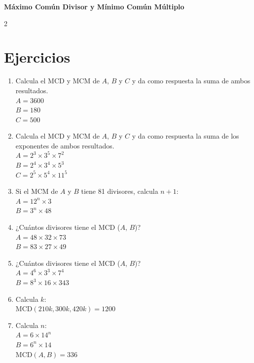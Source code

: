 \documentclass[10pt]{article}
\begin{document}
	\begin{center}
		\Large\bfseries Máximo Común Divisor y Mínimo Común Múltiplo
	\end{center}

\begin{multicols}{2}
	\section*{Ejercicios}
		\begin{enumerate}[label=\textbf{\arabic*.}, itemsep=0.4cm]
			\item Calcula el MCD y MCM de \( A \), \( B \) y \( C \) y da como respuesta la suma de ambos resultados. \\
			\( A = 3600 \) \\
			\( B = 180 \) \\
			\( C = 500 \)

			\item Calcula el MCD y MCM de \( A \), \( B \) y \( C \) y da como respuesta la suma de los exponentes de ambos resultados. \\
			\( A = 2^3 \times 3^5 \times 7^2 \) \\
			\( B = 2^4 \times 3^4 \times 5^3 \) \\
			\( C = 2^5 \times 5^4 \times 11^5 \)

			\item Si el MCM de \( A \) y \( B \) tiene 81 divisores, calcula \( n + 1 \): \\
			\( A = 12^n \times 3 \) \\
			\( B = 3^n \times 48 \)

			\item ¿Cuántos divisores tiene el MCD (\( A \), \( B \))? \\
			\( A = 48 \times 32 \times 73 \) \\
			\( B = 83 \times 27 \times 49 \)

			\item ¿Cuántos divisores tiene el MCD (\( A \), \( B \))? \\
			\( A = 4^6 \times 3^3 \times 7^4 \) \\
			\( B = 8^3 \times 16 \times 343 \)

			\item Calcula \( k \): \\
			\( \text{MCD}(210k, 300k, 420k) = 1200 \)

			\item Calcula \( n \): \\
			\( A = 6 \times 14^n \) \\
			\( B = 6^n \times 14 \) \\
			\( \text{MCD}(A, B) = 336 \)


\end{enumerate}
\end{multicols}
\end{document}
